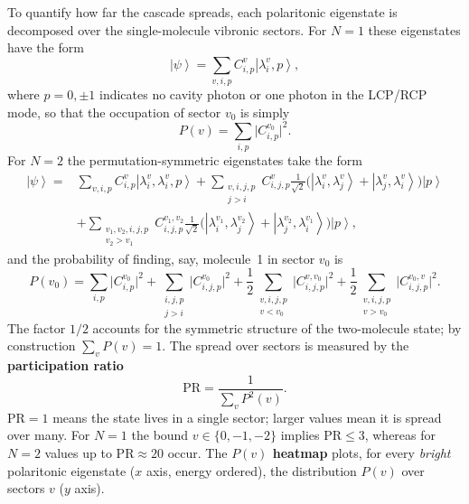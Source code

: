 \documentclass[12pt,a4paper]{article}
\newcommand{\ket}[1]{\left|#1\right\rangle}
\newcommand{\PR}{\mathrm{PR}}
\begin{document}
To quantify how far the cascade spreads, each polaritonic eigenstate is
decomposed over the single-molecule vibronic sectors. For $N=1$ these
eigenstates have the form
\begin{equation}
  \ket{\psi}=\sum_{v,i,p}C^v_{i,p}\ket{\lambda^v_i,p},
  \label{eq:psi1}
\end{equation}
where $p=0,\pm1$ indicates no cavity photon or one photon in the LCP/RCP
mode, so that the occupation of sector $v_0$ is simply
\begin{equation}
  P(v)=\sum_{i,p}\big|C^{v_0}_{i,p}\big|^2 .
  \label{eq:Pv1}
\end{equation}
For $N=2$ the permutation-symmetric eigenstates take the form
\begin{align}
  \ket{\psi}=&\sum_{v,i,p}C^v_{i,p}\ket{\lambda^v_i,\lambda^v_i,p}
   +\!\!\sum_{\substack{v,i,j,p\\ j>i}}\!\!C^v_{i,j,p}\tfrac{1}{\sqrt2}
   \big(\ket{\lambda^v_i,\lambda^v_j}+\ket{\lambda^v_j,\lambda^v_i}\big)\ket{p}
   \nonumber\\
  &+\!\!\sum_{\substack{v_1,v_2,i,j,p\\ v_2>v_1}}\!\!C^{v_1,v_2}_{i,j,p}
   \tfrac{1}{\sqrt2}\big(\ket{\lambda^{v_1}_i,\lambda^{v_2}_j}
   +\ket{\lambda^{v_2}_j,\lambda^{v_1}_i}\big)\ket{p},
  \label{eq:psi2}
\end{align}
and the probability of finding, say, molecule~1 in sector $v_0$ is
\begin{equation}
  P(v_0)=\sum_{i,p}\big|C^{v_0}_{i,p}\big|^2
   +\sum_{\substack{i,j,p\\ j>i}}\big|C^{v_0}_{i,j,p}\big|^2
   +\frac12\sum_{\substack{v,i,j,p\\ v<v_0}}\big|C^{v,v_0}_{i,j,p}\big|^2
   +\frac12\sum_{\substack{v,i,j,p\\ v>v_0}}\big|C^{v_0,v}_{i,j,p}\big|^2 .
  \label{eq:Pv2}
\end{equation}
The factor $1/2$ accounts for the symmetric structure of the two-molecule
state; by construction $\sum_v P(v)=1$. The spread over sectors is measured by
the \textbf{participation ratio}
\begin{equation}
  \PR=\frac{1}{\sum_v P^2(v)} .
  \label{eq:PR}
\end{equation}
$\PR=1$ means the state lives in a single sector; larger values mean it is
spread over many. For $N=1$ the bound $v\in\{0,-1,-2\}$ implies $\PR\le3$,
whereas for $N=2$ values up to $\PR\approx20$ occur. The \textbf{$P(v)$
heatmap} plots, for every \emph{bright} polaritonic eigenstate ($x$ axis,
energy ordered), the distribution $P(v)$ over sectors $v$ ($y$ axis).
\end{document}
